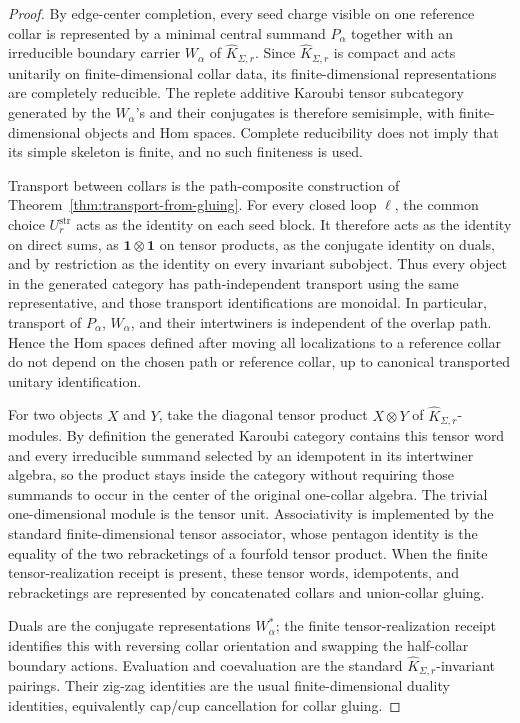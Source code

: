 \documentclass[11pt]{article}
\begin{document}
\begin{proof}
By edge-center completion, every seed charge visible on one reference collar is represented by a
minimal central summand \(P_\alpha\) together with an irreducible boundary carrier \(W_\alpha\) of
\(\widehat K_{\Sigma,r}\). Since \(\widehat K_{\Sigma,r}\) is compact and acts unitarily on
finite-dimensional collar data, its finite-dimensional representations are completely reducible.
The replete additive Karoubi tensor subcategory generated by the \(W_\alpha\)'s and their
conjugates is therefore semisimple, with finite-dimensional objects and Hom spaces. Complete
reducibility does not imply that its simple skeleton is finite, and no such finiteness is used.

Transport between collars is the path-composite construction of
Theorem~\ref{thm:transport-from-gluing}. For every closed loop \(\ell\), the common choice
\(U^{\mathrm{str}}_r\) acts as the identity on each seed block. It therefore acts as the identity
on direct sums, as \(\mathbf 1\otimes\mathbf 1\) on tensor products, as the conjugate identity on
duals, and by restriction as the identity on every invariant subobject. Thus every object in the
generated category has path-independent transport using the same representative, and those
transport identifications are monoidal. In particular, transport of \(P_\alpha\), \(W_\alpha\),
and their intertwiners is independent of the overlap path.
Hence the Hom spaces defined after moving all localizations to a reference collar do not depend on
the chosen path or reference collar, up to canonical transported unitary identification.

For two objects \(X\) and \(Y\), take the diagonal tensor product \(X\otimes Y\) of
\(\widehat K_{\Sigma,r}\)-modules. By definition the generated Karoubi category contains this
tensor word and every irreducible summand selected by an idempotent in its intertwiner algebra, so
the product stays inside the category without requiring those summands to occur in the center of
the original one-collar algebra. The trivial one-dimensional module is the tensor unit.
Associativity is implemented by the standard finite-dimensional tensor associator, whose pentagon
identity is the equality of the two rebracketings of a fourfold tensor product. When the finite
tensor-realization receipt is present, these tensor words, idempotents, and rebracketings are
represented by concatenated collars and union-collar gluing.

Duals are the conjugate representations \(W_\alpha^*\); the finite tensor-realization receipt
identifies this with reversing collar orientation and swapping the half-collar boundary actions.
Evaluation and coevaluation are the standard
\(\widehat K_{\Sigma,r}\)-invariant pairings. Their zig-zag identities are the usual
finite-dimensional duality identities, equivalently cap/cup cancellation for collar gluing.


\end{proof}
\end{document}
